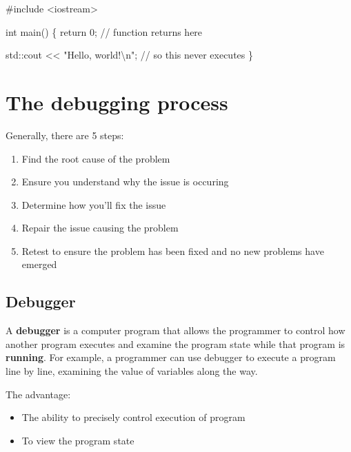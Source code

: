 \documentclass[
  letterpaper,
  DIV=11,
  numbers=noendperiod]{scrreprt}
\newenvironment{Shaded}{\begin{snugshade}}{\end{snugshade}}
\newcommand{\CommentTok}[1]{\textcolor[rgb]{0.37,0.37,0.37}{#1}}
\newcommand{\ControlFlowTok}[1]{\textcolor[rgb]{0.00,0.23,0.31}{#1}}
\newcommand{\DecValTok}[1]{\textcolor[rgb]{0.68,0.00,0.00}{#1}}
\newcommand{\ErrorTok}[1]{\textcolor[rgb]{0.68,0.00,0.00}{#1}}
\newcommand{\FunctionTok}[1]{\textcolor[rgb]{0.28,0.35,0.67}{#1}}
\newcommand{\NormalTok}[1]{\textcolor[rgb]{0.00,0.23,0.31}{#1}}
\newcommand{\SpecialCharTok}[1]{\textcolor[rgb]{0.37,0.37,0.37}{#1}}
\newcommand{\StringTok}[1]{\textcolor[rgb]{0.13,0.47,0.30}{#1}}
\providecommand{\tightlist}{%
  \setlength{\itemsep}{0pt}\setlength{\parskip}{0pt}}\usepackage{longtable,booktabs,array}
\begin{document}
\begin{Shaded}
\begin{Highlighting}[]
\CommentTok{\#include \textless{}iostream\textgreater{}}

\NormalTok{int }\FunctionTok{main}\NormalTok{()}
\NormalTok{\{}
\NormalTok{    return }\DecValTok{0}\NormalTok{; }\SpecialCharTok{/}\ErrorTok{/} \ControlFlowTok{function}\NormalTok{ returns here}

\NormalTok{    std}\SpecialCharTok{::}\NormalTok{cout }\SpecialCharTok{\textless{}}\ErrorTok{\textless{}} \StringTok{"Hello, world!}\SpecialCharTok{\textbackslash{}n}\StringTok{"}\NormalTok{; }\SpecialCharTok{/}\ErrorTok{/}\NormalTok{ so this never executes}
\NormalTok{\}}
\end{Highlighting}
\end{Shaded}

\hypertarget{the-debugging-process}{%
\section{The debugging process}\label{the-debugging-process}}

Generally, there are 5 steps:

\begin{enumerate}
\def\labelenumi{\arabic{enumi}.}
\tightlist
\item
  Find the root cause of the problem
\item
  Ensure you understand why the issue is occuring
\item
  Determine how you'll fix the issue
\item
  Repair the issue causing the problem
\item
  Retest to ensure the problem has been fixed and no new problems have
  emerged
\end{enumerate}

\hypertarget{debugger}{%
\subsection{Debugger}\label{debugger}}

A \textbf{debugger} is a computer program that allows the programmer to
control how another program executes and examine the program state while
that program is \textbf{running}. For example, a programmer can use
debugger to execute a program line by line, examining the value of
variables along the way.

The advantage:

\begin{itemize}
\tightlist
\item
  The ability to precisely control execution of program
\item
  To view the program state
\end{itemize}
\end{document}
